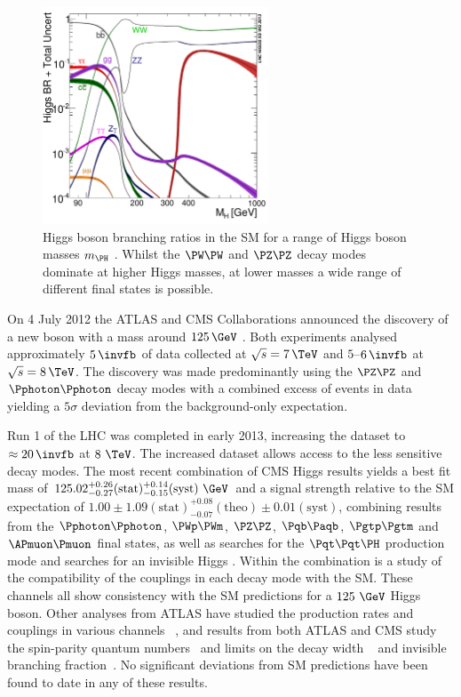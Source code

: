\begin{figure}[htbp]
   \includegraphics[width=0.6\textwidth]{plots/theory/Higgs_BR.pdf}
\caption{Higgs boson branching ratios in the SM for a range of Higgs boson
masses $m_{\PH}$ \cite{Heinemeyer:2013tqa}. Whilst the $\PW\PW$ and $\PZ\PZ$
decay modes dominate at higher Higgs masses, at lower masses a wide range of
different final states is possible.}
\label{fig:SMHiggsBRs}
\end{figure}

On 4 July 2012 the ATLAS and CMS Collaborations announced the discovery of a new
boson with a mass around $125\,\GeV$ \cite{CMSobservation125,ATLASobservation125}. 
Both experiments analysed approximately $5\,\invfb$ of data collected at 
$\sqrt{s}=7\,\TeV$ and $5$--$6\,\invfb$ at $\sqrt{s}=8\,\TeV$. The discovery was
made predominantly using the $\PZ\PZ$ and $\Pphoton\Pphoton$ decay modes with a
combined excess of events in data yielding a $5\sigma$ deviation from the
background-only expectation.

Run 1 of the LHC was completed in early 2013, increasing the dataset to
$\approx20\,\invfb$ at $8~\TeV$. The increased dataset allows access to the less
sensitive decay modes. The most recent combination of CMS Higgs results yields a
best fit mass of
$125.02^{+0.26}_{-0.27}(\text{stat})^{+0.14}_{-0.15}(\text{syst})~\GeV$ and a
signal strength relative to the \ac{SM} expectation of
$1.00\pm1.09(\text{stat})^{+0.08}_{-0.07}(\text{theo})\pm0.01(\text{syst})$,
combining results from the $\Pphoton\Pphoton$, $\PWp\PWm$, $\PZ\PZ$,
$\Pqb\Paqb$, $\Pgtp\Pgtm$ and $\APmuon\Pmuon$ final states, as well as 
searches for the $\Pqt\Pqt\PH$ production mode and searches for an invisible
Higgs \cite{CMScomb}. Within the combination is a study of the compatibility of
the couplings in each decay mode with the \ac{SM}. 
These channels all show consistency with the \ac{SM}
predictions for a $125~\GeV$ Higgs boson. Other analyses from ATLAS have
studied the production rates and couplings in various channels
~\cite{Aad:2014eva,Aad:2014lwa,Aad:2015vsa}, and results from both ATLAS and CMS study 
the spin-parity quantum
numbers~\cite{Chatrchyan:2013mxa,Chatrchyan:2013iaa,Aad:2013xqa} and limits on
the decay width ~\cite{Khachatryan:2014iha} and invisible branching
fraction~\cite{Aad:2014iia,Chatrchyan:2014tja}. No significant deviations from \ac{SM}
predictions have been found to date in any of these results.

